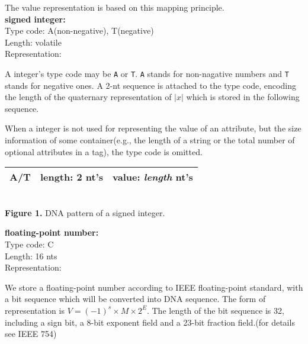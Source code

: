 \documentclass{article}
\begin{document}
The value representation is based on this mapping principle.\\[6pt]
\textbf{signed integer:}\\
Type code: A(non-negative), T(negative)\\
Length: volatile\\
Representation: 
\par A integer's type code may be \texttt{A} or \texttt{T}. \texttt{A} stands for non-nagative numbers and \texttt{T} stands for negative ones. A 2-nt sequence is attached to the type code, encoding the length of the quaternary representation of $|x|$ which is stored in the following sequence.
\par When a integer is not used for representing the value of an attribute, but the size information of some container(e.g., the length of a string or the total number of optional attributes in a tag), the type code is omitted.
\begin{center}
    \begin{tabular}{|c|c|c|}
        \hline
        A/T & length: 2 nt's & value: \textit{length} nt's \\
        \hline
    \end{tabular}
    \\[3pt]{\small \textbf{Figure 1.} DNA pattern of a signed integer.}
\end{center}
\textbf{floating-point number:}\\
Type code: C\\
Length: 16 nts\\
Representation: 
\par We store a floating-point number according to IEEE floating-point standard, with a bit sequence which will be converted into DNA sequence. The form of representation is $V=(-1)^s \times M \times 2^E$. The length of the bit sequence is 32, including a sign bit, a 8-bit exponent field and a 23-bit fraction field.(for details see IEEE 754)
\end{document}
